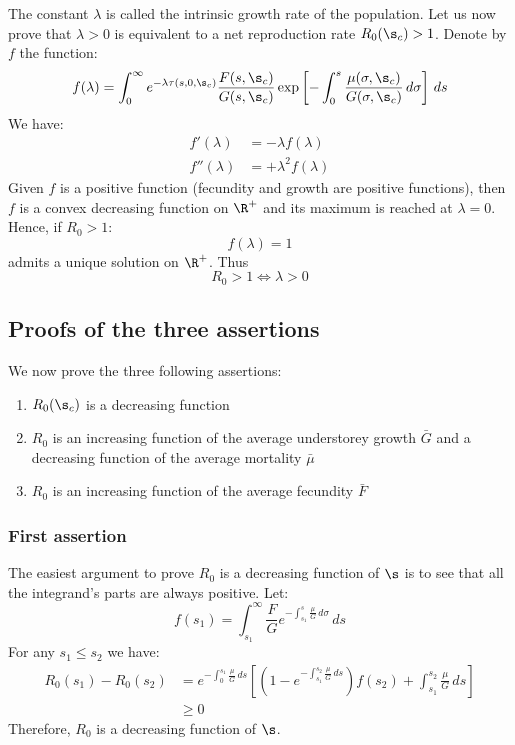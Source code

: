 \begin{refsection}
The constant $ \lambda $ is called the intrinsic growth rate of the population. Let us now prove that $ \lambda > 0 $ is equivalent to a net reproduction rate $ R_0(\s_c) > 1 $. Denote by $ f $ the function:
\[
	f(\lambda) = \int_{0}^{\infty} e^{- \lambda \tau(s, 0, \s_c)} \frac{F(s, \s_c)}{G(s, \s_c)} \exp \left[ -\int_{0}^{s} \frac{\mu(\sigma, \s_c)}{G(\sigma, \s_c)} \, d\sigma \right] \, ds
\]
We have:
\begin{align*}
	f'(\lambda) &= -\lambda f(\lambda) \\
	f''(\lambda) &= +\lambda^2 f(\lambda)
\end{align*}
Given $ f $ is a positive function (fecundity and growth are positive functions), then $ f $ is a convex decreasing function on $ \R^{+} $ and its maximum is reached at $ \lambda = 0 $. Hence, if $ R_0 > 1 $:
\[
	f(\lambda) = 1
\]
admits a unique solution on $ \R^{+} $. Thus
\[
	R_0 > 1 \Leftrightarrow \lambda > 0
\]

\subsection{Proofs of the three assertions \label{app::calc_R0::sec::3asser}}
We now prove the three following assertions:
\begin{enumerate}[label=(\textit{\roman*})]
	\item $ R_0(\s_c) $ is a decreasing function
	\item $ R_0 $ is an increasing function of the average understorey growth $ \bar{G} $ and a decreasing function of the average mortality $ \bar{\mu} $
	\item $ R_0 $ is an increasing function of the average fecundity $ \bar{F} $
\end{enumerate}

\subsubsection{First assertion}
The easiest argument to prove $ R_0 $ is a decreasing function of $ \s $ is to see that all the integrand's parts are always positive. Let:
\[
	f(s_1) = \int_{s_1}^{\infty} \frac{F}{G} e^{-\int_{s_1}^s \frac{\mu}{G} \, d\sigma} \, ds
\]
For any $ s_1 \leqslant s_2 $ we have:
\begin{align*}
	R_0(s_1) - R_0(s_2) &= e^{-\int_{0}^{s_1} \frac{\mu}{G} \, ds} \left[ \left( 1 - e^{-\int_{s_1}^{s_2} \frac{\mu}{G} \, ds} \right) f(s_2) + \int_{s_1}^{s_2} \frac{\mu}{G} \, ds \right] \\
		&\geqslant 0
\end{align*}
Therefore, $ R_0 $ is a decreasing function of $ \s $.


\end{refsection}
